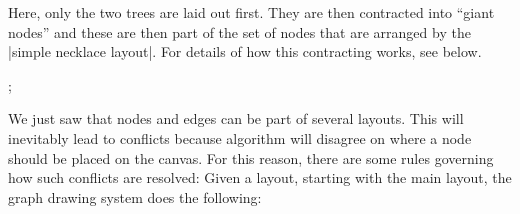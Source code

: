 Here, only the two trees are laid out first. They are then
contracted into ``giant nodes'' and these are then part of the set
of nodes that are arranged by the |simple necklace layout|. For details of
how this contracting works, see below.


\begin{codeexample}[] 
\tikz {};
\end{codeexample}  


We just saw that nodes and edges can be part of several layouts. This
will inevitably lead to conflicts because algorithm will disagree on
where a node should be placed on the canvas. For this reason, there
are some rules governing how such conflicts are resolved: Given a
layout, starting with the main layout, the graph drawing system does
the following: 


